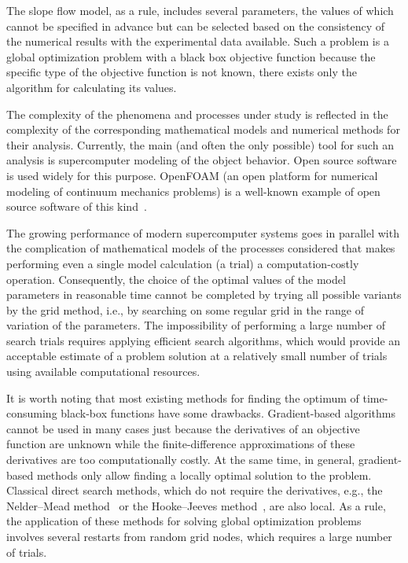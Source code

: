 \documentclass[mathematics,article,accept,pdftex,moreauthors]{Definitions/mdpi}
\begin{document}
The slope flow model, as a rule, includes several parameters, the values of which cannot be specified in advance but can be selected based on the consistency of the numerical results with the experimental data available. Such a problem is a global optimization problem with a black box objective function because the specific type of the objective function is not known, there exists only the algorithm for calculating its values.

The complexity of the phenomena and processes under study is reflected in the complexity of the corresponding mathematical models and numerical methods for their analysis. Currently, the main (and often the only possible) tool for such an analysis is supercomputer modeling of the object behavior. Open source software is used widely for this purpose. OpenFOAM (an open platform for numerical modeling of continuum mechanics problems) is a well-known example of open source software of this kind~\cite{Weller1998}. 

The growing performance of modern supercomputer systems goes in parallel with the complication of mathematical models of the processes considered that makes performing even a single model calculation (a trial) a computation-costly operation. Consequently, the choice of the optimal values of the model parameters in reasonable time cannot be completed by trying all possible variants by the grid method, i.e., by searching on some regular grid in the range of variation of the parameters. The impossibility of performing a large number of search trials requires applying efficient search algorithms, which would provide an acceptable estimate of a problem solution at a relatively small number of trials using available computational resources.

It is worth noting that most existing methods for finding the optimum of time-consuming black-box functions have some drawbacks. Gradient-based algorithms cannot be used in many cases just because the derivatives of an objective function are unknown while the finite-difference approximations of these derivatives are too computationally costly. At the same time, in general, gradient-based methods only allow finding a locally optimal solution to the problem.
Classical direct search methods, which do not require the derivatives, e.g., the Nelder--Mead method~\cite{NelderMead} or the Hooke--Jeeves method~\cite{HookJeeves}, are also local. As a rule, the application of these methods for solving global optimization problems involves several restarts from random grid nodes,  which requires a large number of trials. 
\end{document}
